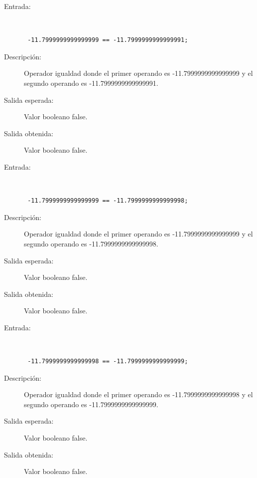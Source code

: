 \begin{framed}
	\begin{description}
		\item [Entrada:] \hfill \\
\begin{lstlisting}
 -11.7999999999999999 == -11.7999999999999991;
\end{lstlisting}
		\item [Descripción:] Operador igualdad donde el primer operando es -11.7999999999999999 y el segundo operando es  -11.7999999999999991.
		\item [Salida esperada:] Valor booleano false.
		\item [Salida obtenida:] Valor booleano false.
	\end{description}
\end{framed}

\begin{framed}
	\begin{description}
		\item [Entrada:] \hfill \\
\begin{lstlisting}
 -11.7999999999999999 == -11.7999999999999998;
\end{lstlisting}
		\item [Descripción:] Operador igualdad donde el primer operando es -11.7999999999999999 y el segundo operando es  -11.7999999999999998.
		\item [Salida esperada:] Valor booleano false.
		\item [Salida obtenida:] Valor booleano false.
	\end{description}
\end{framed}

\begin{framed}
	\begin{description}
		\item [Entrada:] \hfill \\
\begin{lstlisting}
 -11.7999999999999998 == -11.7999999999999999;
\end{lstlisting}
		\item [Descripción:] Operador igualdad donde el primer operando es -11.7999999999999998 y el segundo operando es  -11.7999999999999999.
		\item [Salida esperada:] Valor booleano false.
		\item [Salida obtenida:] Valor booleano false.
	\end{description}
\end{framed}

